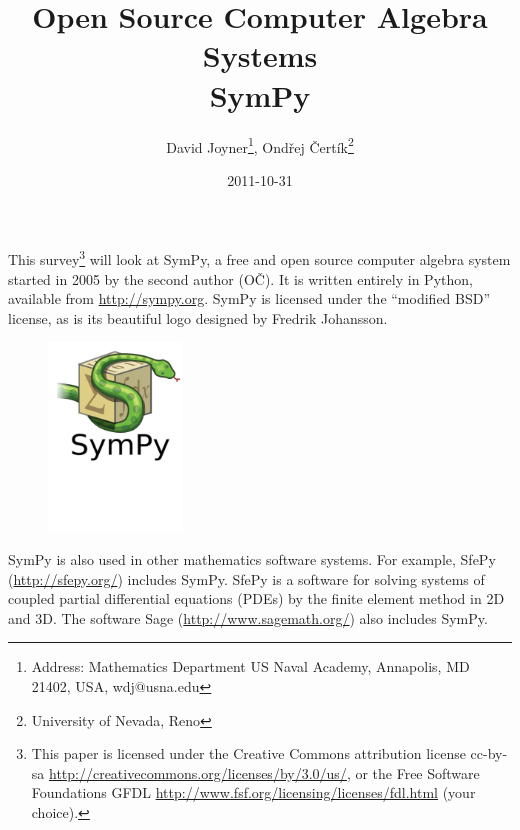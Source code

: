 \documentclass[12pt]{article}
\def\OC{OČ}
\begin{document}
\author{David Joyner\thanks{Address: Mathematics Department
US Naval Academy, Annapolis, MD 21402, USA, wdj@usna.edu},
Ondřej Čertík\thanks{University of Nevada, Reno}}
\title{{\small{Open Source Computer Algebra Systems}}\\ {\LARGE{SymPy}}}

\date{2011-10-31}

\maketitle




This survey\footnote{This paper is licensed under the
Creative Commons attribution license cc-by-sa
\url{http://creativecommons.org/licenses/by/3.0/us/},
or the Free Software Foundations GFDL
\url{http://www.fsf.org/licensing/licenses/fdl.html}
(your choice).} 
will look at SymPy, a free and open source computer algebra
system started in 2005 by the second author (\OC).
It is written entirely in Python, available from 
\url{http://sympy.org}.
SymPy is licensed under the ``modified BSD'' license, as is its
beautiful logo designed by Fredrik Johansson.

\begin{figure}[h!]
\begin{center}
\includegraphics[height=5cm]{sympy-snake-icon.pdf}
\end{center}
\end{figure}

\vskip-2cm

SymPy is also used in other mathematics software systems.
For example, SfePy (\url{http://sfepy.org/})
includes SymPy. SfePy is a software for solving systems of coupled partial differential 
equations (PDEs) by the finite element method in 2D and 3D.
The software Sage (\url{http://www.sagemath.org/}) also includes SymPy.
\end{document}
